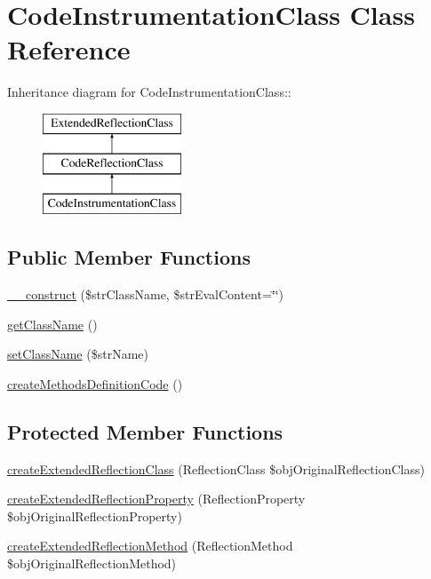 \hypertarget{class_code_instrumentation_class}{
\section{CodeInstrumentationClass Class Reference}
\label{class_code_instrumentation_class}
}
Inheritance diagram for CodeInstrumentationClass::\begin{figure}[H]
\begin{center}
\leavevmode
\includegraphics[height=3cm]{class_code_instrumentation_class}
\end{center}
\end{figure}
\subsection*{Public Member Functions}
\begin{CompactItemize}
\item 
\hyperlink{class_code_instrumentation_class_4df49469648d1e8de92c18bb8ac40b1b}{\_\-\_\-construct} (\$strClassName, \$strEvalContent=\char`\"{}\char`\"{})
\item 
\hyperlink{class_code_instrumentation_class_b8f8ee56588ebf5091c288e44ebdfaf4}{getClassName} ()
\item 
\hyperlink{class_code_instrumentation_class_6392a64e001e141c882fad5419990557}{setClassName} (\$strName)
\item 
\hyperlink{class_code_instrumentation_class_c2d23f8614e24561b794d5031001eaf8}{createMethodsDefinitionCode} ()
\end{CompactItemize}
\subsection*{Protected Member Functions}
\begin{CompactItemize}
\item 
\hyperlink{class_code_instrumentation_class_6b56ec198bc6a5b5a72076e4e7c19e29}{createExtendedReflectionClass} (ReflectionClass \$objOriginalReflectionClass)
\item 
\hyperlink{class_code_instrumentation_class_bce271bf4f7b77b8b11986404241ab5c}{createExtendedReflectionProperty} (ReflectionProperty \$objOriginalReflectionProperty)
\item 
\hyperlink{class_code_instrumentation_class_ec7c1d4b204b6e3a6291d3b867afb688}{createExtendedReflectionMethod} (ReflectionMethod \$objOriginalReflectionMethod)
\end{CompactItemize}
